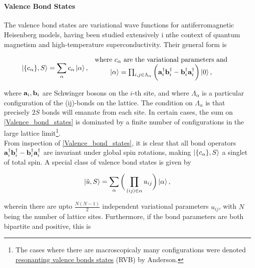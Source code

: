 \documentclass{homework}
\begin{document}
\blanky \\

\paragraph{\textbf{Valence Bond States}}

The valence bond states are variational wave functions for antiferromagnetic Heisenberg models, having been studied extensively i nthe context of quantum magnetism and high-temperature superconductivity. Their general form is 

\begin{equation}
    \ket{\{c_{\alpha}\}, S} = \sum_{\alpha} c_{\alpha} \ket{\alpha}, \begin{array}{c}
         \textnormal{ where $c_{\alpha}$ are the variational parameters and }  \\
         \ket{\alpha} = \prod_{i,j \in \Lambda_{\alpha}} \bigg({\bf a}_i^\dagger {\bf b}_i^\dagger - {\bf b}_i^\dagger {\bf a}_i^\dagger \bigg) \ket{0},
    \end{array}
    \label{Valence_bond_states}
\end{equation}

where ${\bf a}_i, {\bf b}_i$ are Schwinger bosons on the $i$-th site, and where $\Lambda_{\alpha}$ is a particular configuration of the (ij)-bonds on the lattice. The condition on $\Lambda_{\alpha}$ is that precisely $2S$ bonds will emanate from each site. In certain cases, the sum on 
\cref{Valence_bond_states} is dominated by a finite number of configurations in the large lattice limit\footnote{

The cases where there are macroscopicaly many configurations were denoted \underline{resonanting valence bonds states} (RVB) by Anderson.

}. \\

From inspection of \cref{Valence_bond_states}, it is clear that all bond operators ${\bf a}_i^\dagger {\bf b}_i^\dagger - {\bf b}_i^\dagger {\bf a}_i^\dagger$ are invariant under global spin rotations, making $\ket{\{c_{\alpha}\}, S}$ a singlet of total spin. A special class of valence bond states is given by 

\begin{equation}
    \ket{\hat{u}, S} = \sum_{\alpha} \bigg(\prod_{(ij) \in \alpha} u_{ij}\bigg) \ket{\alpha},
    \label{special_class_Valence_bond_states }
\end{equation}

wherein there are upto $\frac{N(N-1)}{2}$ independent variational parameters $u_{ij}$, with $N$ being the number of lattice sites. Furthermore, if the bond parameters are both bipartite and positive, this is 
\end{document}
